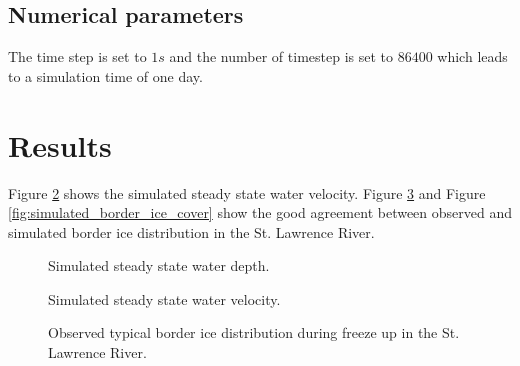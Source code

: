 \subsection{Numerical parameters}
The time step is set to $1s$ and the number of timestep is set to $86400$ which leads to a simulation time of one day.

\section{Results}

Figure \ref{fig:velocity} shows the simulated steady state water velocity. Figure \ref{fig:observed_border_ice_cover} and Figure \ref{fig:simulated_border_ice_cover} show the
good agreement between observed and simulated border ice distribution in the St. Lawrence
River.

\begin{figure}[H]
    \begin{center}
    \end{center}
    \caption{Simulated steady state water depth.}
    \label{fig:water_depth}
\end{figure}

\begin{figure}[H]
    \begin{center}
    \end{center}
    \caption{Simulated steady state water velocity.}
    \label{fig:velocity}
\end{figure}

\begin{figure}[H]
    \begin{center}
    \end{center}
    \caption{Observed typical border ice distribution during freeze up in the St. Lawrence River.}
    \label{fig:observed_border_ice_cover}
\end{figure}


